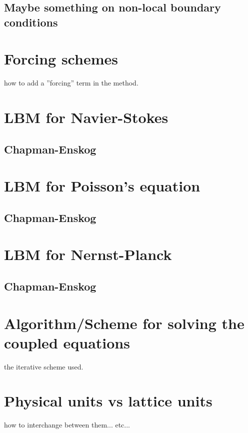 \subsection{Maybe something on non-local boundary conditions}

\section{Forcing schemes}
how to add a ''forcing'' term in the method.

\section{LBM for Navier-Stokes}
\subsection{Chapman-Enskog}

\section{LBM for Poisson's equation}
\subsection{Chapman-Enskog}

\section{LBM for Nernst-Planck}
\subsection{Chapman-Enskog}

\section{Algorithm/Scheme for solving the coupled equations}
the iterative scheme used.

\section{Physical units vs lattice units}
how to interchange between them... etc...
